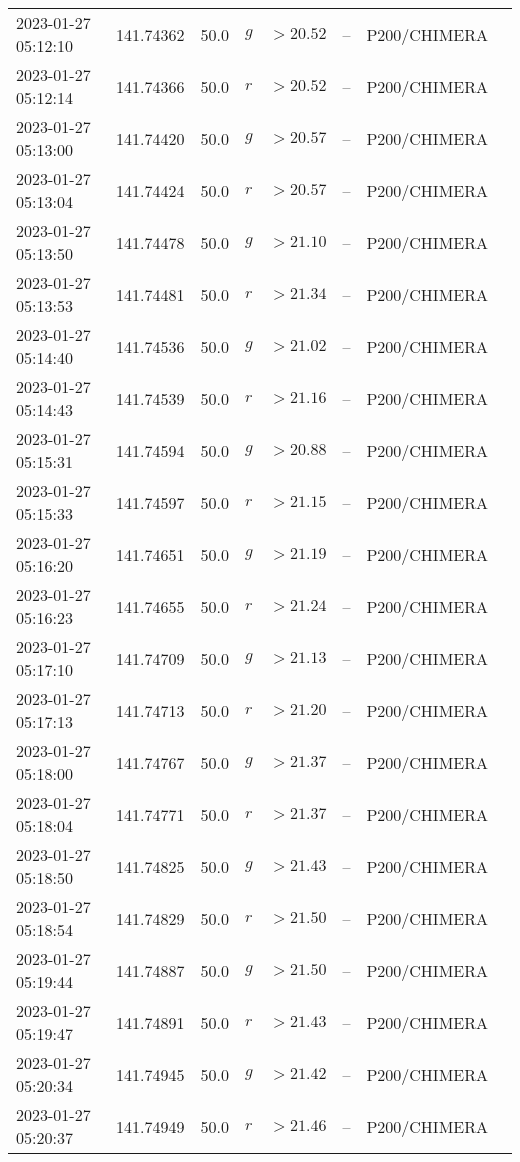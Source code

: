 \documentclass{nature_plusfigure}
\begin{document}
\begin{supplement}
\begin{center}
\begin{longtable}{llllllll}
2023-01-27 05:12:10 & 141.74362 & 50.0 & $g$ & $>20.52$ & -- & P200/CHIMERA &  \\ 
2023-01-27 05:12:14 & 141.74366 & 50.0 & $r$ & $>20.52$ & -- & P200/CHIMERA &  \\ 
2023-01-27 05:13:00 & 141.74420 & 50.0 & $g$ & $>20.57$ & -- & P200/CHIMERA &  \\ 
2023-01-27 05:13:04 & 141.74424 & 50.0 & $r$ & $>20.57$ & -- & P200/CHIMERA &  \\ 
2023-01-27 05:13:50 & 141.74478 & 50.0 & $g$ & $>21.10$ & -- & P200/CHIMERA &  \\ 
2023-01-27 05:13:53 & 141.74481 & 50.0 & $r$ & $>21.34$ & -- & P200/CHIMERA &  \\ 
2023-01-27 05:14:40 & 141.74536 & 50.0 & $g$ & $>21.02$ & -- & P200/CHIMERA &  \\ 
2023-01-27 05:14:43 & 141.74539 & 50.0 & $r$ & $>21.16$ & -- & P200/CHIMERA &  \\ 
2023-01-27 05:15:31 & 141.74594 & 50.0 & $g$ & $>20.88$ & -- & P200/CHIMERA &  \\ 
2023-01-27 05:15:33 & 141.74597 & 50.0 & $r$ & $>21.15$ & -- & P200/CHIMERA &  \\ 
2023-01-27 05:16:20 & 141.74651 & 50.0 & $g$ & $>21.19$ & -- & P200/CHIMERA &  \\ 
2023-01-27 05:16:23 & 141.74655 & 50.0 & $r$ & $>21.24$ & -- & P200/CHIMERA &  \\ 
2023-01-27 05:17:10 & 141.74709 & 50.0 & $g$ & $>21.13$ & -- & P200/CHIMERA &  \\ 
2023-01-27 05:17:13 & 141.74713 & 50.0 & $r$ & $>21.20$ & -- & P200/CHIMERA &  \\ 
2023-01-27 05:18:00 & 141.74767 & 50.0 & $g$ & $>21.37$ & -- & P200/CHIMERA &  \\ 
2023-01-27 05:18:04 & 141.74771 & 50.0 & $r$ & $>21.37$ & -- & P200/CHIMERA &  \\ 
2023-01-27 05:18:50 & 141.74825 & 50.0 & $g$ & $>21.43$ & -- & P200/CHIMERA &  \\ 
2023-01-27 05:18:54 & 141.74829 & 50.0 & $r$ & $>21.50$ & -- & P200/CHIMERA &  \\ 
2023-01-27 05:19:44 & 141.74887 & 50.0 & $g$ & $>21.50$ & -- & P200/CHIMERA &  \\ 
2023-01-27 05:19:47 & 141.74891 & 50.0 & $r$ & $>21.43$ & -- & P200/CHIMERA &  \\ 
2023-01-27 05:20:34 & 141.74945 & 50.0 & $g$ & $>21.42$ & -- & P200/CHIMERA &  \\ 
2023-01-27 05:20:37 & 141.74949 & 50.0 & $r$ & $>21.46$ & -- & P200/CHIMERA &  \\ 

\end{longtable}
\end{center}
\end{supplement}
\end{document}
